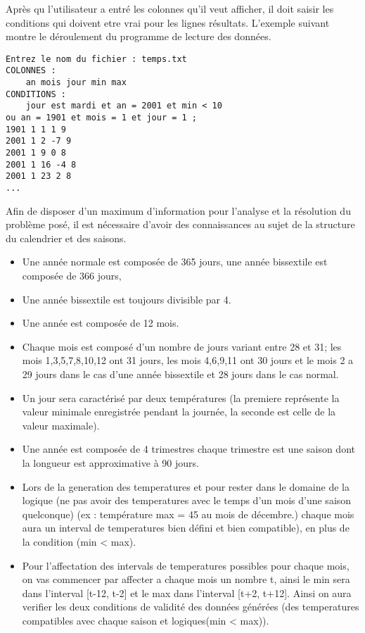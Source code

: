 Après qu l'utilisateur a entré les colonnes qu'il veut afficher,
il doit saisir les conditions qui doivent etre vrai pour les lignes
résultats. L'exemple suivant montre le déroulement du programme de lecture des données.

\begin{lstlisting}
Entrez le nom du fichier : temps.txt
COLONNES : 
    an mois jour min max 
CONDITIONS : 
    jour est mardi et an = 2001 et min < 10
ou an = 1901 et mois = 1 et jour = 1 ;
1901 1 1 1 9 
2001 1 2 -7 9 
2001 1 9 0 8 
2001 1 16 -4 8 
2001 1 23 2 8 
...
\end{lstlisting}  

Afin de disposer d’un maximum d’information pour l’analyse et la résolution du problème posé,
il est nécessaire d’avoir des connaissances au sujet de la structure du calendrier et des saisons.

\begin{itemize}
\item Une année normale est composée de 365 jours, une année bissextile est composée de 366 jours,
\item Une année bissextile est toujours divisible par 4.
\item Une année est composée de 12 mois.
\item Chaque mois est composé d’un nombre de jours variant entre 28 et 31; les mois 
1,3,5,7,8,10,12 ont 31 jours, les mois 4,6,9,11 ont 30 jours et le mois 2 a 29 jours 
dans le cas d’une année bissextile et 28 jours dans le cas normal.


\item Un jour sera caractérisé par deux températures (la premiere représente la valeur minimale
 enregistrée pendant la journée,
 la seconde est celle de la valeur maximale).
 
\item Une année est composée de 4 trimestres chaque trimestre est une saison dont la 
longueur est approximative à 90 jours.

\item Lors de la generation des temperatures et pour rester dans le domaine de la 
logique (ne pas avoir des temperatures avec le temps d’un mois d’une saison quelconque) 
(ex : température max = 45 au mois de décembre.) chaque mois aura un interval de temperatures
 bien défini et bien compatible), en plus de la condition (min < max).

\item Pour l’affectation des intervals de temperatures possibles pour chaque mois, 
on vas commencer par affecter a chaque mois un nombre t,
 ainsi le min sera dans l’interval [t-12, t-2] et le max dans l’interval [t+2, t+12].
  Ainsi on aura verifier les deux conditions de validité des données générées
   (des temperatures compatibles avec chaque saison et logiques(min < max)).
\end{itemize}

